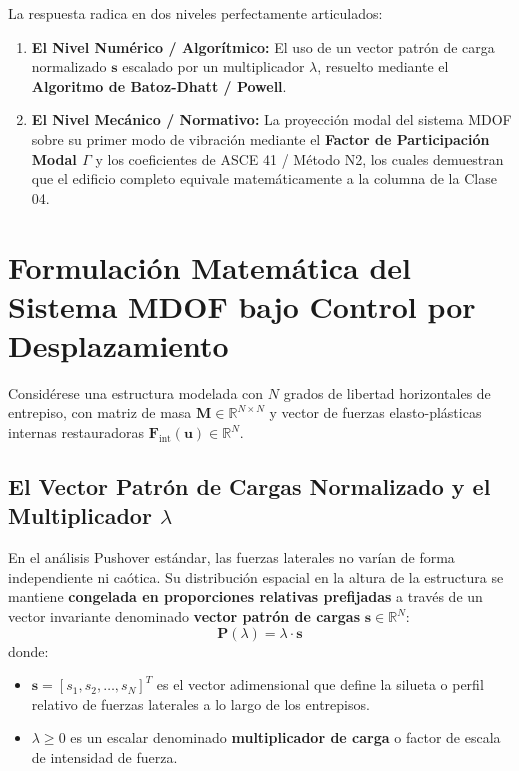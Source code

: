\documentclass[11pt,letterpaper]{article}
\begin{document}
La respuesta radica en dos niveles perfectamente articulados:
\begin{enumerate}
    \item \textbf{El Nivel Numérico / Algorítmico:} El uso de un vector patrón de carga normalizado $\mathbf{s}$ escalado por un multiplicador $\lambda$, resuelto mediante el \textbf{Algoritmo de Batoz-Dhatt / Powell}.
    \item \textbf{El Nivel Mecánico / Normativo:} La proyección modal del sistema MDOF sobre su primer modo de vibración mediante el \textbf{Factor de Participación Modal $\Gamma$} y los coeficientes de ASCE 41 / Método N2, los cuales demuestran que el edificio completo equivale matemáticamente a la columna de la Clase 04.
\end{enumerate}

\section{Formulación Matemática del Sistema MDOF bajo Control por Desplazamiento}

Considérese una estructura modelada con $N$ grados de libertad horizontales de entrepiso, con matriz de masa $\mathbf{M} \in \mathbb{R}^{N \times N}$ y vector de fuerzas elasto-plásticas internas restauradoras $\mathbf{F}_{\text{int}}(\mathbf{u}) \in \mathbb{R}^N$.

\subsection{El Vector Patrón de Cargas Normalizado y el Multiplicador \texorpdfstring{$\lambda$}{lambda}}

En el análisis Pushover estándar, las fuerzas laterales no varían de forma independiente ni caótica. Su distribución espacial en la altura de la estructura se mantiene \textbf{congelada en proporciones relativas prefijadas} a través de un vector invariante denominado \textbf{vector patrón de cargas} $\mathbf{s} \in \mathbb{R}^N$:
\begin{equation}
    \mathbf{P}(\lambda) = \lambda \cdot \mathbf{s}
    \label{eq:fuerzas_patron}
\end{equation}
donde:
\begin{itemize}
    \item $\mathbf{s} = [s_1, s_2, \dots, s_N]^T$ es el vector adimensional que define la silueta o perfil relativo de fuerzas laterales a lo largo de los entrepisos.
    \item $\lambda \ge 0$ es un escalar denominado \textbf{multiplicador de carga} o factor de escala de intensidad de fuerza.
\end{itemize}
\end{document}

